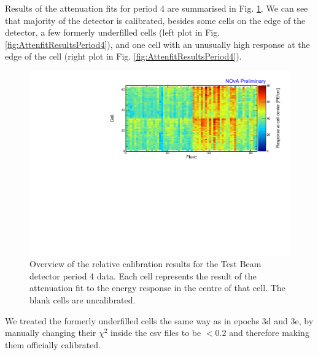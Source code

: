 Results of the attenuation fits for period 4 are summarised in Fig. \ref{fig:CellCentreResponsePeriod4}. We can see that majority of the detector is calibrated, besides some cells on the edge of the detector, a few formerly underfilled cells (left plot in Fig. \ref{fig:AttenfitResultsPeriod4}), and one cell with an unusually high response at the edge of the cell (right plot in Fig. \ref{fig:AttenfitResultsPeriod4}).

\begin{figure}[!hbtp]
\centering
\includegraphics[width=\textwidth]{Plots/TBCalibration/CellResponseAtCentre_period4_Limited_NOvAPlotStyle.pdf}
\caption[Map of fitted response at cell centre for period 4 data]{Overview of the relative calibration results for the Test Beam detector period 4 data. Each cell represents the result of the attenuation fit to the energy response in the centre of that cell. The blank cells are uncalibrated.}
\label{fig:CellCentreResponsePeriod4}
\end{figure}

We treated the formerly underfilled cells the same way as in epochs 3d and 3e, by manually changing their $\chi^2$ inside the csv files to be $<0.2$ and therefore making them officially calibrated.

